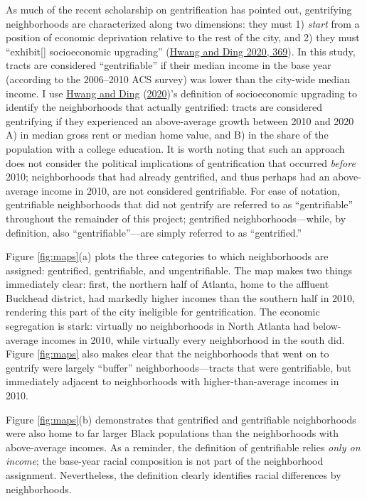 \documentclass[
  12pt,
]{article}
\begin{document}
As much of the recent scholarship on gentrification has pointed out, gentrifying neighborhoods are characterized along two dimensions: they must 1) \emph{start} from a position of economic deprivation relative to the rest of the city, and 2) they must ``exhibit{[}{]} socioeconomic upgrading'' (\protect\hyperlink{ref-Hwang2020}{Hwang and Ding 2020, 369}). In this study, tracts are considered ``gentrifiable'' if their median income in the base year (according to the 2006--2010 ACS survey) was lower than the city-wide median income. I use \protect\hyperlink{ref-Hwang2020}{Hwang and Ding} (\protect\hyperlink{ref-Hwang2020}{2020})'s definition of socioeconomic upgrading to identify the neighborhoods that actually gentrified: tracts are considered gentrifying if they experienced an above-average growth between 2010 and 2020 A) in median gross rent or median home value, and B) in the share of the population with a college education. It is worth noting that such an approach does not consider the political implications of gentrification that occurred \emph{before} 2010; neighborhoods that had already gentrified, and thus perhaps had an above-average income in 2010, are not considered gentrifiable. For ease of notation, gentrifiable neighborhoods that did not gentrify are referred to as ``gentrifiable'' throughout the remainder of this project; gentrified neighborhoods---while, by definition, also ``gentrifiable''---are simply referred to as ``gentrified.''

Figure \ref{fig:maps}(a) plots the three categories to which neighborhoods are assigned: gentrified, gentrifiable, and ungentrifiable. The map makes two things immediately clear: first, the northern half of Atlanta, home to the affluent Buckhead district, had markedly higher incomes than the southern half in 2010, rendering this part of the city ineligible for gentrification. The economic segregation is stark: virtually no neighborhoods in North Atlanta had below-average incomes in 2010, while virtually every neighborhood in the south did. Figure \ref{fig:maps} also makes clear that the neighborhoods that went on to gentrify were largely ``buffer'' neighborhoods---tracts that were gentrifiable, but immediately adjacent to neighborhoods with higher-than-average incomes in 2010.

Figure \ref{fig:maps}(b) demonstrates that gentrified and gentrifiable neighborhoods were also home to far larger Black populations than the neighborhoods with above-average incomes. As a reminder, the definition of gentrifiable relies \emph{only on income}; the base-year racial composition is not part of the neighborhood assignment. Nevertheless, the definition clearly identifies racial differences by neighborhoods.
\end{document}

